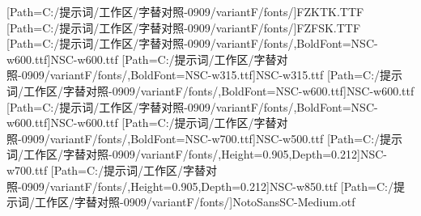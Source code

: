 \setmainfont{Times New Roman}
[Path=C:/提示词/工作区/字替对照-0909/variantF/fonts/]{FZKTK.TTF}
[Path=C:/提示词/工作区/字替对照-0909/variantF/fonts/]{FZFSK.TTF}
[Path=C:/提示词/工作区/字替对照-0909/variantF/fonts/,BoldFont=NSC-w600.ttf]{NSC-w600.ttf}
[Path=C:/提示词/工作区/字替对照-0909/variantF/fonts/,BoldFont=NSC-w315.ttf]{NSC-w315.ttf}
[Path=C:/提示词/工作区/字替对照-0909/variantF/fonts/,BoldFont=NSC-w600.ttf]{NSC-w600.ttf}
[Path=C:/提示词/工作区/字替对照-0909/variantF/fonts/,BoldFont=NSC-w600.ttf]{NSC-w600.ttf}
[Path=C:/提示词/工作区/字替对照-0909/variantF/fonts/,BoldFont=NSC-w700.ttf]{NSC-w500.ttf}
\newfontfamily{\numboldjian}[Path=C:/提示词/工作区/字替对照-0909/variantF/fonts/,Height=0.905,Depth=0.212]{NSC-w700.ttf}
\newfontfamily{\numbold}[Path=C:/提示词/工作区/字替对照-0909/variantF/fonts/,Height=0.905,Depth=0.212]{NSC-w850.ttf}
\newfontfamily{\numpnum}[Path=C:/提示词/工作区/字替对照-0909/variantF/fonts/]{NotoSansSC-Medium.otf}
